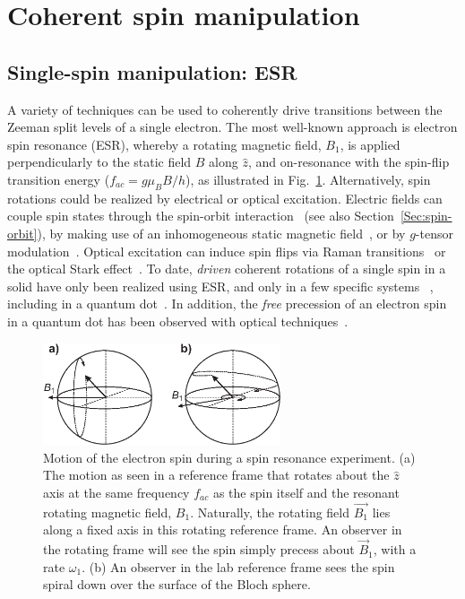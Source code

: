 \documentclass[12pt,aps,nofootinbib]{revtex4-1}
\begin{document}
\section{Coherent spin manipulation}
\label{Section:Coherent}

\subsection{Single-spin manipulation: ESR}
\label{Sec:esr} A variety of techniques can be used to
coherently drive transitions between the Zeeman split levels of a
single electron. The most well-known approach is electron spin
resonance (ESR), whereby a rotating magnetic field, $B_{1}$, is
applied perpendicularly to the static field $B$ along $\hat{z}$,
and on-resonance with the spin-flip transition energy ($f_{ac}=g
\mu_B B / h$), as illustrated in
Fig.~\ref{fig:nutation}\cite{poole}. Alternatively, spin rotations
could be realized by electrical or optical excitation.
Electric fields can couple spin states through the spin-orbit
interaction~\cite{DobrowolskaPRL1982,kato03a,debald05,schulte05,golovach06} (see also
Section~\ref{Sec:spin-orbit}), by making use of an inhomogeneous
static magnetic field~\cite{tokura06}, or by $g$-tensor
modulation~\cite{kato03b}. Optical excitation can induce spin
flips via Raman transitions~\cite{imamoglu99} or the optical Stark effect~\cite{gupta01}. To date,
\emph{driven} coherent rotations of a single spin in a solid have
only been realized using ESR, and only in a few specific systems ~\cite{xiao04,rugar04,jelezko04,hansonprb2006}, including in a quantum
dot~\cite{koppens06}. In addition, the \emph{free} precession of
an electron spin in a quantum dot has been observed with optical
techniques~\cite{dutt05,greilich06a}.

\begin{figure}[htb]
\includegraphics[width=7cm]{hanson_fig41.eps}
\caption{Motion of the electron spin during a spin resonance
experiment. (a) The motion as seen in a reference frame that
rotates about the $\hat{z}$ axis at the same frequency $f_{ac}$ as
the spin itself and the resonant rotating magnetic field, $B_1$.
Naturally, the rotating field $\vec{B_1}$ lies along a fixed axis
in this rotating reference frame. An observer in the rotating
frame will see the spin simply precess about $\vec{B}_1$, with a
rate $\omega_1$. (b) An observer in the lab reference frame sees
the spin spiral down over the surface of the Bloch sphere.}
\label{fig:nutation}
\end{figure}
\end{document}
